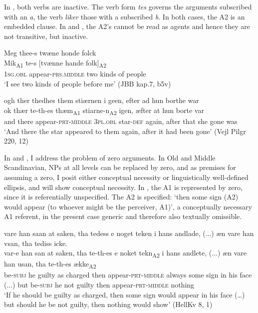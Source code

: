 \documentclass[output=paper]{langscibook}
\begin{document}
In , both verbs are inactive. The verb form \textit{tes} governs the arguments subscribed with an \textit{a}, the verb \textit{liker} those with a subscribed \textit{b}. In both cases, the A2 is an embedded clause. In  and , the A2's cannot be read as agents and hence they are not transitive, but inactive.

\begin{exe} 
\ex \label{ex:heltoft:13} 
    \glll Meg\textsubscript{} thee-s twæne honde folck\textsubscript{} \\
         Mik\textsubscript{A1}    te-s          [tvænne hande  folk]\textsubscript{A2}\\
         \textsc{1sg.obl}   appear-\textsc{prs.middle}    two {kinds of} people\\
    \glt `I see two kinds of people before me' (JBB kap.7, b5v)

\ex \label{ex:heltoft:14} 
    \glll ogh ther thedhes them stiærnen {i geen,} efter ad hun borthe war \\
         ok thær   te-th-es       thæm\textsubscript{A1}   stiarne-n\textsubscript{A2}   igen,   æfter at hun borte   var \\
         and there  appear-\textsc{prt-middle}  \textsc{3pl.obl}  star-\textsc{def}     again,  after that she gone   was \\  
    \glt `And there the star appeared to them again, after it had been gone' (Vejl Pilgr 220, 12)
\end{exe}

In  and , I address the problem of zero arguments. In Old and Middle Scandinavian, NPs at all levels can be replaced by zero, and as premises for assuming a zero, I posit either conceptual necessity or linguistically well-defined ellipsis, and  will show conceptual necessity.  In , the A1 is represented by zero, since it is referentially unspecified. The A2 is specified: ‘then some sign (A2) would appear (to whoever might be the perceiver, A1)', a conceptually necessary A1 referent, in the present case generic and therefore also textually omissible.

\ea \label{ex:heltoft:15} 
    \glll vare han saan at saken, tha tedess e noget teken i hans andlade, (...) æn vare han vsan, tha tediss icke. \\
        var-e     han san at saken,     tha   {te-th-es}           e noket tekn\textsubscript{A2}  i hans   andlete, (...) æn vare       han usan,     tha  {te-th-es}            ække\textsubscript{A2}\\
        be-\textsc{subj}  he guilty as charged  then   {appear-\textsc{prt-middle}}    always  some   sign    in his face  (...)    but be-\textsc{subj}    he {not guilty}  then {appear-\textsc{prt-middle}}  nothing\\
    \glt `If he should be guilty as charged, then some sign would appear in his face (…) but should he be not guilty, then nothing would show' (HellKv 8, 1)
\z
\end{document}
